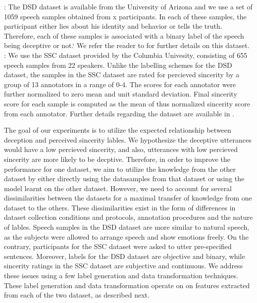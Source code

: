 \documentclass{article}
\begin{document}
:
The DSD dataset is available from the University of Arizona and we use a set of 1059 speech samples obtained from x participants.
In each of these samples, the participant either lies about his identity and behavior or tells the truth. 
Therefore, each of these samples is associated with a binary label of the speech being deceptive or not.`
We refer the reader to \cite{} for further details on this dataset.\\ 

:
We use the SSC dataset provided by the Columbia Univesity, consisting of 655 speech samples from 22 speakers.
Unlike the labelling schemes for the DSD dataset, the samples in the SSC dataset are rated for percieved sincerity by a group of 13 annotators in a range of 0-4. 
The scores for each annotator were further normalized to zero mean and unit standard deviation.
Final sincerity score for each sample is computed as the mean of thus normalized sincerity score from each annotator.
Further details regarding the dataset are available in \cite{}.

The goal of our experiments is to utilize the expected relationship between deception and perceived sincerity lables.
We hypothesize the deceptive utterances would have a low percieved sincerity, and also, utterances with low percieved sincerity are more likely to be decptive.
Therefore, in order to improve the performance for one dataset, we aim to utilize the knowledge from the other dataset by either directly using the datasamples from that dataset or using the model learnt on the other dataset.
However, we need to account for several dissimilarities between the datasets for a maximal transfer of knowledge from one dataset to the others.
These dissimilarities exist in the form of differences in dataset collection conditions and protocols, annotation procedures and the nature of lables.
Speech samples in the DSD dataset are more similar to natural speech, as the subjects were allowed to arrange speech and show emotions freely. 
On the contrary, participants for the SSC dataset were asked to utter pre-specified sentences. 
Moreover, labels for the DSD dataset are objective and binary, while sincerity ratings in the SSC dataset are subjective and continuous.
We address these issues using a few label generation and data transformation techniques.
These label generation and data transformation operate on on features extracted from each of the two dataset, as described next.
\end{document}
